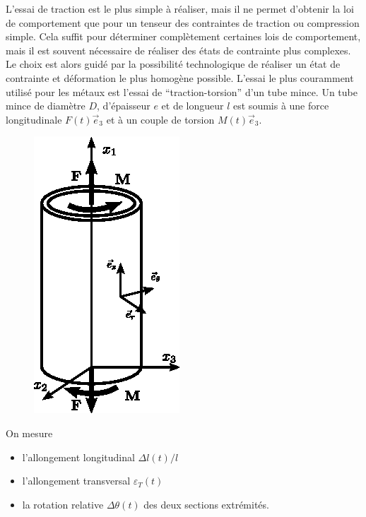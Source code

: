 L'essai de traction est le plus simple à réaliser, mais il ne permet d'obtenir la loi de comportement que pour un tenseur des contraintes de traction ou compression simple.
Cela suffit pour déterminer complètement certaines lois de comportement, mais il est souvent nécessaire de réaliser des états de contrainte plus complexes.
Le choix est alors guidé par la possibilité technologique de réaliser un état de contrainte et déformation le plus homogène possible.
L'essai le plus couramment utilisé pour les métaux est l'essai de ``traction-torsion'' d'un tube mince.
Un tube mince de diamètre $D$, d'épaisseur $e$ et de longueur $l$ est soumis à une force longitudinale $F(t) \vec{e}_3$ et à un couple de torsion $M(t) \vec{e}_3$.

\begin{figure}
    \begin{center}
        \includegraphics{../images/T1_Ch04-0008}
    \end{center}
\end{figure}
On mesure
\begin{itemize}
    \item l'allongement longitudinal $\Delta l(t)/l$
    \item l'allongement transversal $\varepsilon_T(t)$
    \item la rotation relative $\Delta \theta(t)$ des deux sections extrémités.
\end{itemize}
\endinput
tian est G2tr...nê àans le repère local (~'l..'.e.@, .e~) associé aux coorcionnées cy­

; 1 [> ,
0 0 0 0 
1 rET 
<-1 1 
(36) cr 0 0 iM/rrli e i &: 1 0 }) t:.fj/4 t  
= ET
=1 
, i 
L 1 0 J L , ,
tMjrr n".e-FI Tf. Ti~ l 0 :Dtle/4-L M./L 
superposition d'une traction simple et d'un cisaillement simple. 
Ce type dtessai convient pour des matériaux suffisamment consistants_ En mécanique des sols, où l'on a affaire à des matériaux peu ou pas cohérents, on utilise classiquement deux types d'essais. 

